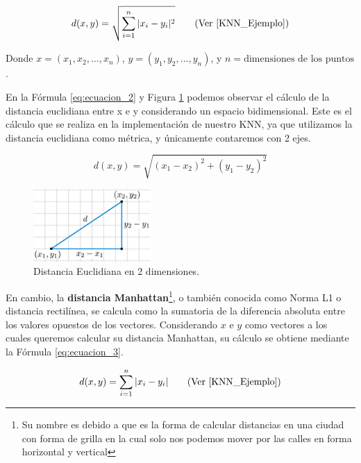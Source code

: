 \documentclass[12pt,a4paper]{article}
\begin{document}
\begin{sloppypar}
\begin{equation}\label{eq:ecuacion_1}
d(x,y)=\sqrt{\sum_{i=1}^{n}|x_{i}-y_{i}|^2}   \qquad  \text{(Ver \cite{KNN_Ejemplo})}
\end{equation}

Donde $x=(x_{1},x_{2},..., x_{n})$, $y = (y_{1},y_{2},...,y_{n})$, y $n = \text{dimensiones de los puntos}$.

En la Fórmula \ref{eq:ecuacion_2} y Figura \ref{fig:KNN_2_Dim} podemos observar el cálculo de la distancia euclidiana entre x e y  considerando un espacio bidimensional. Este es el cálculo que se realiza en la implementación de nuestro KNN, ya que utilizamos la distancia euclidiana como métrica, y únicamente contaremos con 2 ejes.

\begin{equation}\label{eq:ecuacion_2}
d(x,y)=\sqrt{(x_{1}-x_{2})^2 + (y_{1}-y_{2})^2}
\end{equation}

\begin{figure}[H]    %
 \centering
 \includegraphics[width=0.4\textwidth]{images/KNN_2_Dim.png}
 \captionsetup{justification=centering,margin=2cm}
 \caption{Distancia Euclidiana en 2 dimensiones.} 
 \label{fig:KNN_2_Dim}
\end{figure}

En cambio, la \textbf{distancia Manhattan}\footnote{Su nombre es debido a que es la forma de calcular distancias en una ciudad con forma de grilla en la cual solo nos podemos mover por las calles en forma horizontal y vertical}, o también conocida como Norma L1 o distancia rectilínea, se calcula como la sumatoria de la diferencia absoluta entre los valores opuestos de los vectores.  Considerando $x$ e $y$ como vectores a los cuales queremos calcular su distancia Manhattan, su cálculo se obtiene mediante la Fórmula \ref{eq:ecuacion_3}.

\begin{equation}\label{eq:ecuacion_3}
d(x,y)=\sum_{i=1}^{n}|x_{i}-y_{i}|  \qquad  \text{(Ver \cite{KNN_Ejemplo})}
\end{equation}


\end{sloppypar}
\end{document}
